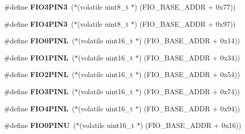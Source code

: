 \begin{DoxyCompactItemize}
\item 
\mbox{\label{group__lpc24xx__regs_ga47e49a99283060d2e2d3edd8dc7e6632}} 
\#define {\bfseries F\+I\+O3\+P\+I\+N3}~($\ast$(volatile uint8\+\_\+t $\ast$) (F\+I\+O\+\_\+\+B\+A\+S\+E\+\_\+\+A\+D\+DR + 0x77))
\item 
\mbox{\label{group__lpc24xx__regs_ga3c14758ee7e3f31e93bc2a22a5bce3a0}} 
\#define {\bfseries F\+I\+O4\+P\+I\+N3}~($\ast$(volatile uint8\+\_\+t $\ast$) (F\+I\+O\+\_\+\+B\+A\+S\+E\+\_\+\+A\+D\+DR + 0x97))
\item 
\mbox{\label{group__lpc24xx__regs_gaa1161c502a00e178f8c24181a0e103ba}} 
\#define {\bfseries F\+I\+O0\+P\+I\+NL}~($\ast$(volatile uint16\+\_\+t $\ast$) (F\+I\+O\+\_\+\+B\+A\+S\+E\+\_\+\+A\+D\+DR + 0x14))
\item 
\mbox{\label{group__lpc24xx__regs_ga9372ee64b6e789f742e129da9e42612a}} 
\#define {\bfseries F\+I\+O1\+P\+I\+NL}~($\ast$(volatile uint16\+\_\+t $\ast$) (F\+I\+O\+\_\+\+B\+A\+S\+E\+\_\+\+A\+D\+DR + 0x34))
\item 
\mbox{\label{group__lpc24xx__regs_ga18cc1c96af692fd97fa400f184e9f88e}} 
\#define {\bfseries F\+I\+O2\+P\+I\+NL}~($\ast$(volatile uint16\+\_\+t $\ast$) (F\+I\+O\+\_\+\+B\+A\+S\+E\+\_\+\+A\+D\+DR + 0x54))
\item 
\mbox{\label{group__lpc24xx__regs_ga352387e998a9c63b15a0872ca6605015}} 
\#define {\bfseries F\+I\+O3\+P\+I\+NL}~($\ast$(volatile uint16\+\_\+t $\ast$) (F\+I\+O\+\_\+\+B\+A\+S\+E\+\_\+\+A\+D\+DR + 0x74))
\item 
\mbox{\label{group__lpc24xx__regs_ga3b6aaa6cdfb258ee7687dbf060a068e5}} 
\#define {\bfseries F\+I\+O4\+P\+I\+NL}~($\ast$(volatile uint16\+\_\+t $\ast$) (F\+I\+O\+\_\+\+B\+A\+S\+E\+\_\+\+A\+D\+DR + 0x94))
\item 
\mbox{\label{group__lpc24xx__regs_ga1a9929a7e790d5b40f0a5dc6be66ff05}} 
\#define {\bfseries F\+I\+O0\+P\+I\+NU}~($\ast$(volatile uint16\+\_\+t $\ast$) (F\+I\+O\+\_\+\+B\+A\+S\+E\+\_\+\+A\+D\+DR + 0x16))
\item 
\mbox{\label{group__lpc24xx__regs_ga22a77fea5e7e96aeba1babd4b03bafc3}} 

\end{DoxyCompactItemize}

